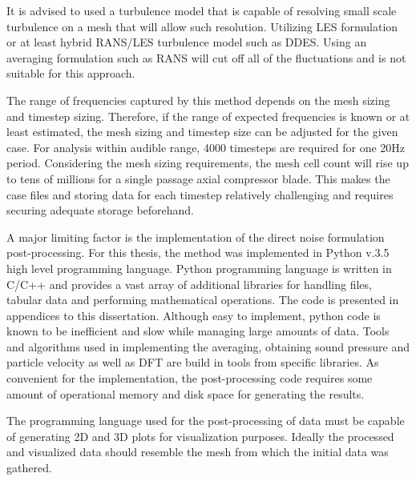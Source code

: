 It is advised to used a turbulence model that is capable of resolving small scale turbulence on a mesh that will allow such resolution. Utilizing LES formulation or at least hybrid RANS/LES turbulence model such as DDES. Using an averaging formulation such as RANS will cut off all of the fluctuations and is not suitable for this approach.


The range of frequencies captured by this method depends on the mesh sizing and timestep sizing. Therefore, if the range of expected frequencies is known or at least estimated, the mesh sizing and timestep size can be adjusted for the given case. For analysis within audible range, 4000 timesteps are required for one 20Hz period. Considering the mesh sizing requirements, the mesh cell count will rise up to tens of millions for a single passage axial compressor blade. This makes the case files and storing data for each timestep relatively challenging and requires securing adequate storage beforehand.
 
A major limiting factor is the implementation of the direct noise formulation post-processing. For this thesis, the method was implemented in Python v.3.5 high level programming language. Python programming language is written in C/C++ and provides a vast array of additional libraries for handling files, tabular data and performing mathematical operations. The code is presented in appendices to this dissertation. Although easy to implement, python code is known to be inefficient and slow while managing large amounts of data. Tools and algorithms used in implementing the averaging, obtaining sound pressure and particle velocity as well as DFT are build in tools from specific libraries. As convenient for the implementation, the post-processing code requires some amount of operational memory and disk space for generating the results.

The programming language used for the post-processing of data must be capable of generating 2D and 3D plots for visualization purposes. Ideally the processed and visualized data should resemble the mesh from which the initial data was gathered.
